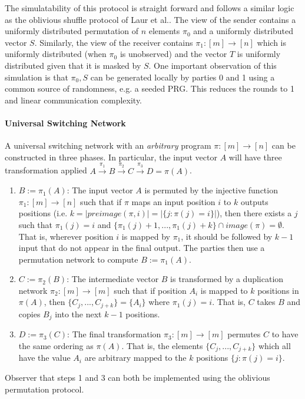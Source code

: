 The simulatability of this protocol is straight forward and follows a similar logic as the oblivious shuffle protocol of Laur et al.\cite{LWZ11}. The view of the sender contains a uniformly distributed permutation of $n$ elements $\pi_0$ and a uniformly distributed vector $S$. Similarly, the view of the receiver contains $\pi_1: [m]\rightarrow [n]$ which is uniformly distributed (when $\pi_0$ is unobserved) and the vector $T$ is uniformly distributed given that it is masked by $S$. One important observation of this simulation is that $\pi_0,S$ can be generated locally by parties 0 and 1 using a common source of randomness, e.g. a seeded PRG. This reduces the rounds to 1 and linear communication complexity. 

\paragraph{Universal Switching Network}\label{sec:switch}

A universal switching network with an \emph{arbitrary} program $\pi : [m]\rightarrow [n]$ can be constructed in three phases\cite{MS13, CMRS18}. In particular, the input vector $A$ will have three transformation applied $A\overset{\pi_1}{\rightarrow}B\overset{\pi_2}{\rightarrow}C\overset{\pi_3}{\rightarrow}D=\pi(A)$.
\begin{enumerate}
	\item $B:=\pi_1(A)$:  The input vector $A$ is permuted by the injective function $\pi_1:[m]\rightarrow[n]$ such that if $\pi$ maps an input position $i$ to $k$ outputs positions (i.e. $k=|preimage(\pi,i)|=|\{ j : \pi(j)=i \}|$), then there exists a $j$ such that $\pi_1(j)=i$  and $\{\pi_1(j)+ 1,...,\pi_1(j )+k \} \cap image(\pi) = \emptyset$. That is, wherever position $i$ is mapped by $\pi_1$, it should be followed by $k-1$ input that do not appear in the final output. The parties then use a permutation network to compute $B:=\pi_1(A)$.
	
	\item $C:=\pi_2(B)$: The intermediate vector $B$ is transformed by a duplication network $\pi_2:[m]\rightarrow[m]$ such that if position $A_i$ is mapped to $k$ positions in $\pi(A)$, then $\{ C_{j},...,C_{j+k}\} = \{A_i\}$ where $\pi_1(j)=i$. That is, $C$ takes $B$ and copies $B_{j}$ into the next $k-1$ positions. 
	
	\item $D:=\pi_3(C)$: The final transformation $\pi_3:[m]\rightarrow[m]$  permutes $C$ to have the same ordering as $\pi(A)$. That is, the elements $\{ C_{j},...,C_{j+k}\}$ which all have the value  $A_i$ are arbitrary mapped to the $k$ positions $\{ j : \pi(j)=i \}$.
\end{enumerate}
Observer that steps 1 and 3 can both be implemented using the oblivious permutation protocol.%

